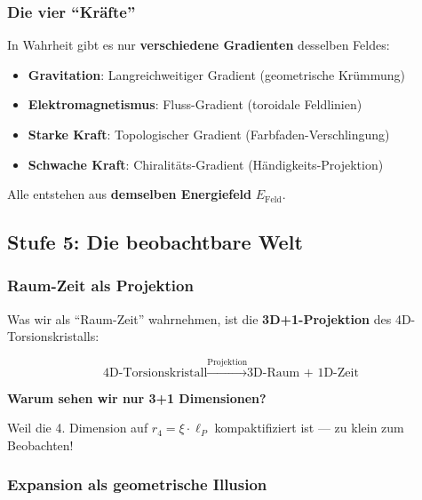	\subsubsection{Die vier \enquote{Kräfte}}

	In Wahrheit gibt es nur \textbf{verschiedene Gradienten} desselben Feldes:

	\begin{itemize}
		\item \textbf{Gravitation}: Langreichweitiger Gradient (geometrische Krümmung)
		\item \textbf{Elektromagnetismus}: Fluss-Gradient (toroidale Feldlinien)
		\item \textbf{Starke Kraft}: Topologischer Gradient (Farbfaden-Verschlingung)
		\item \textbf{Schwache Kraft}: Chiralitäts-Gradient (Händigkeits-Projektion)
	\end{itemize}

	Alle entstehen aus \textbf{demselben Energiefeld} $E_{\text{Feld}}$.

	\subsection{Stufe 5: Die beobachtbare Welt}

	\subsubsection{Raum-Zeit als Projektion}

	Was wir als \enquote{Raum-Zeit} wahrnehmen, ist die \textbf{3D+1-Projektion} des 4D-Torsionskristalls:

	\begin{equation}
		\text{4D-Torsionskristall} \xrightarrow{\text{Projektion}} \text{3D-Raum + 1D-Zeit}
	\end{equation}

	\textbf{Warum sehen wir nur 3+1 Dimensionen?}

	Weil die 4. Dimension auf $r_4 = \xi \cdot \ell_P$ kompaktifiziert ist — zu klein zum Beobachten!

	\subsubsection{Expansion als geometrische Illusion}

